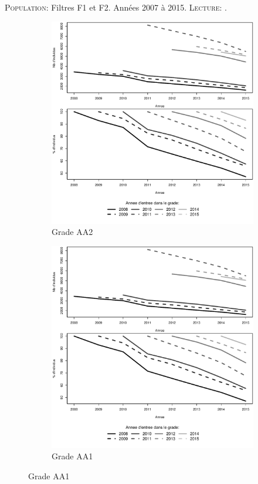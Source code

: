 \documentclass[11pt,a4paper]{article}
\begin{document}
\begin{minipage}{12cm}
\footnotesize
\textsc{Population:} Filtres F1 et F2. Années 2007 à 2015.
\textsc{Lecture:} .
\end{minipage}


\begin{figure}[ht] 
  \caption{Survie dans le grade: Adjoints administratifs}
  \label{echelon_by_neg} 
  \begin{subfigure}[b]{0.55\linewidth}
      \caption{Grade AA2} 
    \label{echelon_by_neg_0} 
    \centering
    \includegraphics[width=1\linewidth]{survival_AA_1.pdf} 
    \vspace{4ex}
  \end{subfigure}
  \begin{subfigure}[b]{0.55\linewidth}
        \caption{Grade AA1} 
    \label{echelon_by_neg_1} 
    \centering
    \includegraphics[width=1\linewidth]{survival_AA_2.pdf} 

\end{subfigure}
\end{figure}
\end{document}
